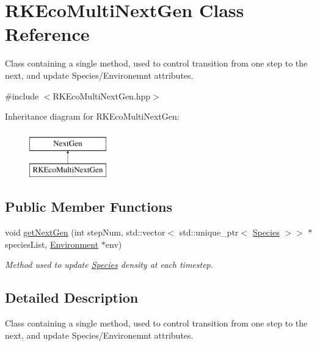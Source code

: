\hypertarget{classRKEcoMultiNextGen}{}\section{R\+K\+Eco\+Multi\+Next\+Gen Class Reference}
\label{classRKEcoMultiNextGen}


Class containing a single method, used to control transition from one step to the next, and update Species/\+Environemnt attributes.  




{\ttfamily \#include $<$R\+K\+Eco\+Multi\+Next\+Gen.\+hpp$>$}

Inheritance diagram for R\+K\+Eco\+Multi\+Next\+Gen\+:\begin{figure}[H]
\begin{center}
\leavevmode
\includegraphics[height=2.000000cm]{classRKEcoMultiNextGen}
\end{center}
\end{figure}
\subsection*{Public Member Functions}
\begin{DoxyCompactItemize}
\item 
void \hyperlink{classRKEcoMultiNextGen_aa6d54650b88870c97b2882dad942c1b1}{get\+Next\+Gen} (int step\+Num, std\+::vector$<$ std\+::unique\+\_\+ptr$<$ \hyperlink{classSpecies}{Species} $>$$>$ $\ast$species\+List, \hyperlink{classEnvironment}{Environment} $\ast$env)
\begin{DoxyCompactList}\small\item\em Method used to update \hyperlink{classSpecies}{Species} density at each timestep. \end{DoxyCompactList}\end{DoxyCompactItemize}


\subsection{Detailed Description}
Class containing a single method, used to control transition from one step to the next, and update Species/\+Environemnt attributes. 


